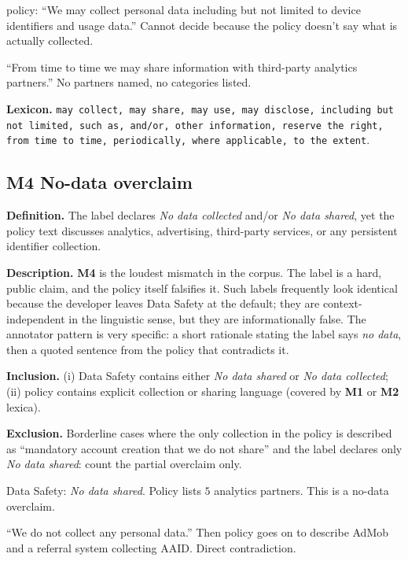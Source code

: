 \documentclass[11pt,a4paper]{article}
\newcommand{\code}[1]{\textsf{\textbf{#1}}}
\begin{document}
\begin{rationale}
[APP-$0223$] policy: ``We may collect personal data including but
not limited to device identifiers and usage data.'' Cannot decide
because the policy doesn't say what is actually collected.
\end{rationale}
\begin{rationale}
``From time to time we may share information with third-party
analytics partners.'' No partners named, no categories listed.
\end{rationale}

\textbf{Lexicon.} \texttt{may collect, may share, may use, may
disclose, including but not limited, such as, and/or, other
information, reserve the right, from time to time, periodically,
where applicable, to the extent}.

\subsection{\code{M4} No-data overclaim}
\label{sec:M4}
\textbf{Definition.} The label declares \textsl{No data collected}
and/or \textsl{No data shared}, yet the policy text discusses
analytics, advertising, third-party services, or any persistent
identifier collection.

\textbf{Description.} \code{M4} is the loudest mismatch in the
corpus. The label is a hard, public claim, and the policy itself
falsifies it. Such labels frequently look identical because the
developer leaves Data Safety at the default; they are
context-independent in the linguistic sense, but they are
informationally false. The annotator pattern is very specific: a
short rationale stating the label says \emph{no data}, then a quoted
sentence from the policy that contradicts it.

\textbf{Inclusion.} (i) Data Safety contains either \textsl{No data
shared} or \textsl{No data collected}; (ii) policy contains explicit
collection or sharing language (covered by \code{M1} or \code{M2}
lexica).

\textbf{Exclusion.} Borderline cases where the only collection in the
policy is described as ``mandatory account creation that we do not
share'' and the label declares only \textsl{No data shared}: count
the partial overclaim only.

\begin{rationale}
[APP-$0392$] Data Safety: \textsl{No data shared}. Policy lists
$5$ analytics partners. This is a no-data overclaim.
\end{rationale}
\begin{rationale}
``We do not collect any personal data.'' Then policy goes on to
describe AdMob and a referral system collecting AAID. Direct
contradiction.
\end{rationale}
\end{document}
